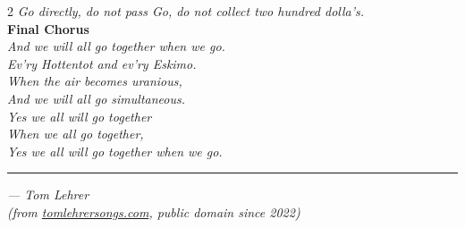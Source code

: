 \begin{commentary}
\begin{multicols}{2}
\textit{Go directly, do not pass Go, do not collect two hundred dolla's.}\\[0.3em]
\noindent\textbf{Final Chorus}\\[0.15em]
\textit{And we will all go together when we go.}\\
\textit{Ev'ry Hottentot and ev'ry Eskimo.}\\
\textit{When the air becomes uranious,}\\
\textit{And we will all go simultaneous.}\\
\textit{Yes we all will go together}\\
\textit{When we all go together,}\\
\textit{Yes we all will go together when we go.}

\end{multicols}
\normalsize
\vspace{0.2em}
\noindent\rule{\textwidth}{0.5pt}
\vspace{0.2em}
\hfill\textit{— Tom Lehrer}\\[0.1em]
\hfill\small\textit{(from \href{https://tomlehrersongs.com}{tomlehrersongs.com}, public domain since 2022)}

\end{commentary}
